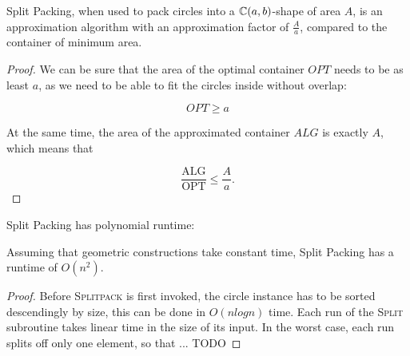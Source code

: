 \documentclass[a4paper,style=print,bibliography=totoc,nexus,lnum,extramargin]{tubsbook}
\begin{document}
\begin{theorem}
    Split Packing, when used to pack circles into a $\mathbb{C}(a,b)$-shape of area $A$, is an approximation algorithm with an approximation factor of $\frac{A}{a}$, compared to the container of minimum area.
\end{theorem}

\begin{proof}
    We can be sure that the area of the optimal container $OPT$ needs to be as least $a$, as we need to be able to fit the circles inside without overlap:

    $$OPT \ge a$$

    At the same time, the area of the approximated container $ALG$ is exactly $A$, which means that

    $$\frac{\text{ALG}}{\text{OPT}} \le \frac{A}{a}.$$
\end{proof}

Split Packing has polynomial runtime:

\begin{theorem}
    Assuming that geometric constructions take constant time, Split Packing has a runtime of $O(n^2)$.
\end{theorem}

\begin{proof}
    Before \textsc{Splitpack} is first invoked, the circle instance has to be sorted descendingly by size, this can be done in $O(n log n)$ time. Each run of the \textsc{Split} subroutine takes linear time in the size of its input. In the worst case, each run splits off only one element, so that ... TODO
\end{proof}
\end{document}
